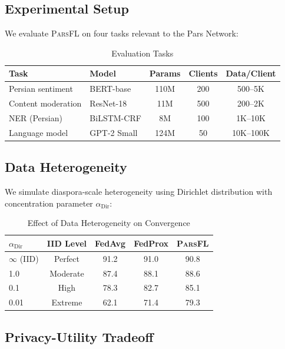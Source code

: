 \documentclass[11pt,a4paper]{article}
\newcommand{\parsfl}{\textsc{ParsFL}\xspace}
\begin{document}
\subsection{Experimental Setup}

We evaluate \parsfl on four tasks relevant to the Pars Network:

\begin{table}[H]
\centering
\caption{Evaluation Tasks}
\label{tab:tasks}
\begin{tabular}{llccc}
\toprule
\textbf{Task} & \textbf{Model} & \textbf{Params} & \textbf{Clients} & \textbf{Data/Client} \\
\midrule
Persian sentiment & BERT-base & 110M & 200 & 500--5K \\
Content moderation & ResNet-18 & 11M & 500 & 200--2K \\
NER (Persian) & BiLSTM-CRF & 8M & 100 & 1K--10K \\
Language model & GPT-2 Small & 124M & 50 & 10K--100K \\
\bottomrule
\end{tabular}
\end{table}

\subsection{Data Heterogeneity}

We simulate diaspora-scale heterogeneity using Dirichlet distribution with concentration parameter $\alpha_{\text{Dir}}$:

\begin{table}[H]
\centering
\caption{Effect of Data Heterogeneity on Convergence}
\label{tab:heterogeneity}
\begin{tabular}{lcccc}
\toprule
$\alpha_{\text{Dir}}$ & \textbf{IID Level} & \textbf{FedAvg} & \textbf{FedProx} & \textbf{\parsfl} \\
\midrule
$\infty$ (IID) & Perfect & 91.2 & 91.0 & 90.8 \\
1.0 & Moderate & 87.4 & 88.1 & 88.6 \\
0.1 & High & 78.3 & 82.7 & 85.1 \\
0.01 & Extreme & 62.1 & 71.4 & 79.3 \\
\bottomrule
\end{tabular}
\end{table}

\subsection{Privacy-Utility Tradeoff}
\end{document}
